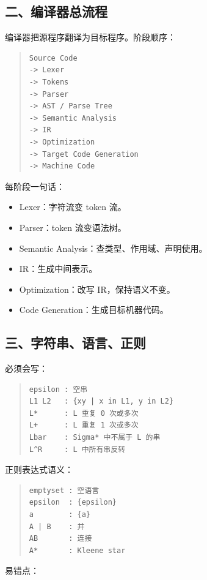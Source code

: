 \documentclass[UTF8,zihao=-4]{ctexart}
\begin{document}
\subsection{二、编译器总流程}


编译器把源程序翻译为目标程序。阶段顺序：


\begin{quote}
\footnotesize
\begin{verbatim}
Source Code
-> Lexer
-> Tokens
-> Parser
-> AST / Parse Tree
-> Semantic Analysis
-> IR
-> Optimization
-> Target Code Generation
-> Machine Code
\end{verbatim}
\end{quote}


每阶段一句话：


\begin{itemize}
\item Lexer：字符流变 token 流。
\item Parser：token 流变语法树。
\item Semantic Analysis：查类型、作用域、声明使用。
\item IR：生成中间表示。
\item Optimization：改写 IR，保持语义不变。
\item Code Generation：生成目标机器代码。
\end{itemize}


\subsection{三、字符串、语言、正则}


必须会写：


\begin{quote}
\footnotesize
\begin{verbatim}
epsilon : 空串
L1 L2   : {xy | x in L1, y in L2}
L*      : L 重复 0 次或多次
L+      : L 重复 1 次或多次
Lbar    : Sigma* 中不属于 L 的串
L^R     : L 中所有串反转
\end{verbatim}
\end{quote}


正则表达式语义：


\begin{quote}
\footnotesize
\begin{verbatim}
emptyset : 空语言
epsilon  : {epsilon}
a        : {a}
A | B    : 并
AB       : 连接
A*       : Kleene star
\end{verbatim}
\end{quote}


易错点：
\end{document}
